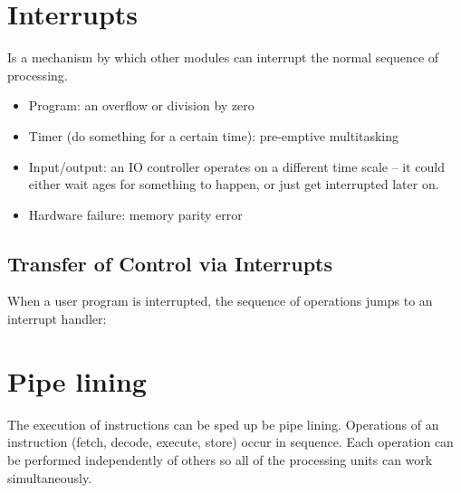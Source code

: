 \section{Interrupts}\label{sec:interrupts}

Is a mechanism by which other modules can interrupt the normal sequence of processing.

\begin{itemize}
	\item Program: an overflow or division by zero
	\item Timer (do something for a certain time): pre-emptive multitasking
	\item Input/output: an IO controller operates on a different time scale -- it could either wait ages for something to happen, or just get interrupted later on.
	\item Hardware failure: memory parity error
\end{itemize}

\subsection{Transfer of Control via Interrupts}\label{sub:transfer_of_control_via_interrupts}

When a user program is interrupted, the sequence of operations jumps to an interrupt handler:

\begin{center}
\end{center}

\section{Pipe lining}\label{sec:pipe_lining}

The execution of instructions can be sped up be pipe lining.
Operations of an instruction (fetch, decode, execute, store) occur in sequence.
Each operation can be performed independently of others so all of the processing units can work simultaneously.

